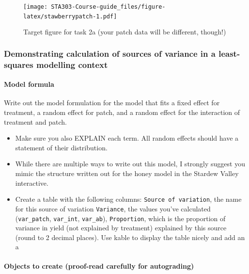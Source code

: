 \documentclass[
  openany]{book}
\begin{document}
\begin{figure}
\centering
\texttt{[image: STA303-Course-guide\_files/figure-latex/stawberrypatch-1.pdf]}
\caption{\label{fig:stawberrypatch}Target figure for task 2a (your patch data will be different, though!)}
\end{figure}

\hypertarget{demonstrating-calculation-of-sources-of-variance-in-a-least-squares-modelling-context}{%
\subsubsection{Demonstrating calculation of sources of variance in a least-squares modelling context}\label{demonstrating-calculation-of-sources-of-variance-in-a-least-squares-modelling-context}}

\hypertarget{model-formula}{%
\paragraph{Model formula}\label{model-formula}}

Write out the model formulation for the model that fits a fixed effect for treatment, a random effect for patch, and a random effect for the interaction of treatment and patch.

\begin{itemize}
\item
  Make sure you also EXPLAIN each term. All random effects should have a statement of their distribution.
\item
  While there are multiple ways to write out this model, I strongly suggest you mimic the structure written out for the honey model in the Stardew Valley interactive.
\item
  Create a table with the following columns: \texttt{Source\ of\ variation}, the name for this source of variation \texttt{Variance}, the values you've calculated (\texttt{var\_patch}, \texttt{var\_int}, \texttt{var\_ab}), \texttt{Proportion}, which is the proportion of variance in yield (not explained by treatment) explained by this source (round to 2 decimal places). Use kable to display the table nicely and add an a
\end{itemize}

\hypertarget{objects-to-create-proof-read-carefully-for-autograding}{%
\paragraph{Objects to create (proof-read carefully for autograding)}\label{objects-to-create-proof-read-carefully-for-autograding}}
\end{document}
